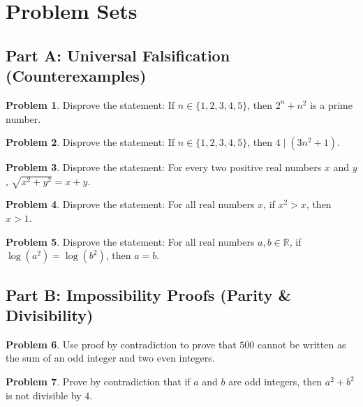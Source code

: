 \documentclass[11pt]{article}
\theoremstyle{definition}
\newtheorem{problem}{Problem}
\begin{document}
\newpage

\section{Problem Sets}
\label{sec:problems}

\subsection{Part A: Universal Falsification (Counterexamples)}

\begin{problem}
Disprove the statement: If $n \in \{1, 2, 3, 4, 5\}$, then $2^n + n^2$ is a prime number.
\end{problem}

\begin{problem}
Disprove the statement: If $n \in \{1, 2, 3, 4, 5\}$, then $4 \mid (3n^2 + 1)$.
\end{problem}

\begin{problem}
Disprove the statement: For every two positive real numbers $x$ and $y$, $\sqrt{x^2 + y^2} = x + y$.
\end{problem}

\begin{problem}
Disprove the statement: For all real numbers $x$, if $x^2 > x$, then $x > 1$.
\end{problem}

\begin{problem}
Disprove the statement: For all real numbers $a, b \in \mathbb{R}$, if $\log(a^2) = \log(b^2)$, then $a = b$.
\end{problem}

\subsection{Part B: Impossibility Proofs (Parity \& Divisibility)}

\begin{problem}
Use proof by contradiction to prove that $500$ cannot be written as the sum of an odd integer and two even integers.
\end{problem}

\begin{problem}
Prove by contradiction that if $a$ and $b$ are odd integers, then $a^2 + b^2$ is not divisible by $4$.
\end{problem}
\end{document}
